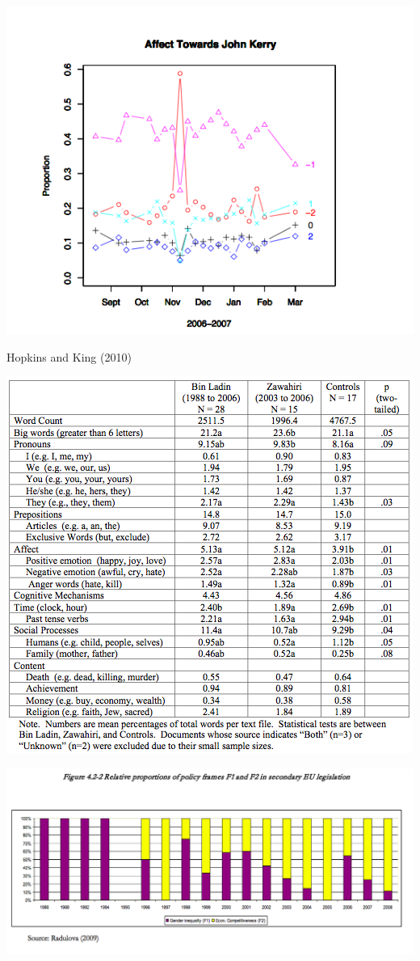 \documentclass[11pt,compress,professionalfonts]{beamer}
\begin{document}
\centerline{\includegraphics[scale=.7]{pictures/kerry-blogs}}
Hopkins and King (2010)


\begin{center}
\includegraphics[scale=.7]{pictures/binladen}
\end{center}


\centerline{\includegraphics[scale=.75]{pictures/radulova-frames2}}
\end{document}
